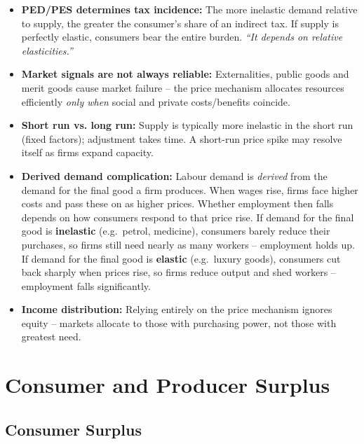 \documentclass[11pt, a4paper, twoside]{book}
\begin{document}
\begin{tcolorbox}[enhanced,colback=EvalBg,colframe=EvalFrame,arc=0pt,boxrule=1pt,title={\bfseries\color{EvalFrame}Evaluation: The Price Mechanism and Elasticities},fonttitle=\small]
\small\RaggedRight
\begin{itemize}[itemsep=2pt,topsep=2pt]
  \item \textbf{PED/PES determines tax incidence:} The more inelastic demand relative to supply, the greater the consumer's share of an indirect tax. If supply is perfectly elastic, consumers bear the entire burden. \textit{``It depends on relative elasticities.''}
  \item \textbf{Market signals are not always reliable:} Externalities, public goods and merit goods cause market failure -- the price mechanism allocates resources efficiently \textit{only when} social and private costs/benefits coincide.
  \item \textbf{Short run vs. long run:} Supply is typically more inelastic in the short run (fixed factors); adjustment takes time. A short-run price spike may resolve itself as firms expand capacity.
  \item \textbf{Derived demand complication:} Labour demand is \emph{derived} from the demand for the final good a firm produces. When wages rise, firms face higher costs and pass these on as higher prices. Whether employment then falls depends on how consumers respond to that price rise. If demand for the final good is \textbf{inelastic} (e.g.\ petrol, medicine), consumers barely reduce their purchases, so firms still need nearly as many workers -- employment holds up. If demand for the final good is \textbf{elastic} (e.g.\ luxury goods), consumers cut back sharply when prices rise, so firms reduce output and shed workers -- employment falls significantly.
  \item \textbf{Income distribution:} Relying entirely on the price mechanism ignores equity -- markets allocate to those with purchasing power, not those with greatest need.
\end{itemize}
\end{tcolorbox}

\section{Consumer and Producer Surplus}

\subsection{Consumer Surplus}
\end{document}
